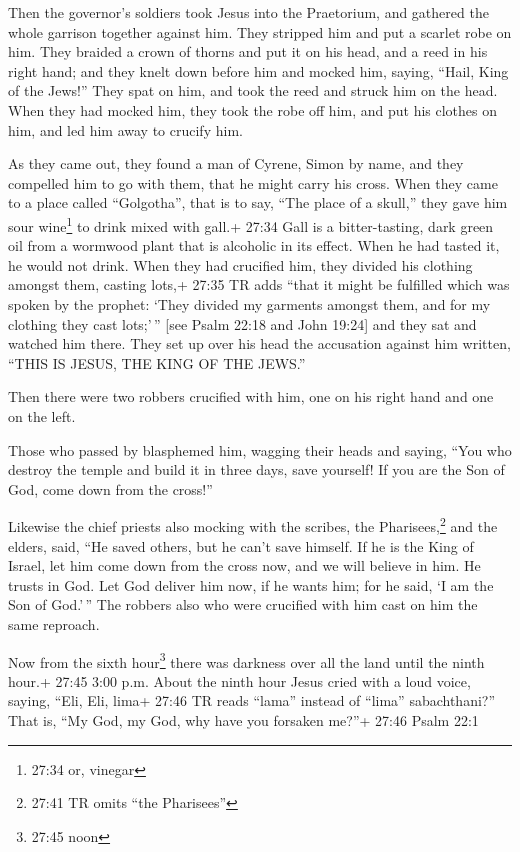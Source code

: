  Then the governor's soldiers took Jesus into the
Praetorium, and gathered the whole garrison together against him.
 They stripped him and put a scarlet robe on him.
 They braided a crown of thorns and put it on his head, and
a reed in his right hand; and they knelt down before him and mocked him,
saying, ``Hail, King of the Jews!''  They spat on him, and
took the reed and struck him on the head.  When they had
mocked him, they took the robe off him, and put his clothes on him, and
led him away to crucify him.

 As they came out, they found a man of Cyrene, Simon by
name, and they compelled him to go with them, that he might carry his
cross.  When they came to a place called ``Golgotha'', that
is to say, ``The place of a skull,''  they gave him sour
wine\footnote{27:34 or, vinegar} to drink mixed with gall.+ 27:34 Gall
is a bitter-tasting, dark green oil from a wormwood plant that is
alcoholic in its effect. When he had tasted it, he would not drink.
 When they had crucified him, they divided his clothing
amongst them, casting lots,+ 27:35 TR adds ``that it might be fulfilled
which was spoken by the prophet: `They divided my garments amongst them,
and for my clothing they cast lots;'\,'' {[}see Psalm 22:18 and John
19:24{]}  and they sat and watched him there. 
They set up over his head the accusation against him written, ``THIS IS
JESUS, THE KING OF THE JEWS.''

 Then there were two robbers crucified with him, one on his
right hand and one on the left.

 Those who passed by blasphemed him, wagging their heads
 and saying, ``You who destroy the temple and build it in
three days, save yourself! If you are the Son of God, come down from the
cross!''

 Likewise the chief priests also mocking with the scribes,
the Pharisees,\footnote{27:41 TR omits ``the Pharisees''} and the
elders, said,  ``He saved others, but he can't save
himself. If he is the King of Israel, let him come down from the cross
now, and we will believe in him.  He trusts in God. Let God
deliver him now, if he wants him; for he said, `I am the Son of
God.'\,''  The robbers also who were crucified with him
cast on him the same reproach.

 Now from the sixth hour\footnote{27:45 noon} there was
darkness over all the land until the ninth hour.+ 27:45 3:00 p.m.
 About the ninth hour Jesus cried with a loud voice,
saying, ``Eli, Eli, lima+ 27:46 TR reads ``lama'' instead of ``lima''
sabachthani?'' That is, ``My God, my God, why have you forsaken me?''+
27:46 Psalm 22:1

